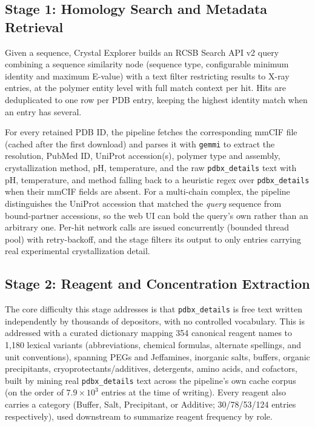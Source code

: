 \subsection{Stage 1: Homology Search and Metadata Retrieval}

Given a sequence, Crystal Explorer builds an RCSB Search API v2 query
combining a sequence similarity node (sequence type, configurable minimum
identity and maximum E-value) with a text filter restricting results to
X-ray entries, at the polymer entity level with full match context per
hit. Hits are deduplicated to one row per PDB entry, keeping the
highest identity match when an entry has several.

For every retained PDB ID, the pipeline fetches the corresponding mmCIF
file (cached after the first download) and parses it with \texttt{gemmi} to
extract the resolution, PubMed ID, UniProt accession(s), polymer type and
assembly, crystallization method, pH, temperature, and the raw
\texttt{pdbx\_details} text with pH, temperature, and method falling
back to a heuristic regex over \texttt{pdbx\_details} when their mmCIF
fields are absent. For a multi-chain complex, the pipeline distinguishes
the UniProt accession that matched the \emph{query} sequence from
bound-partner accessions, so the web UI can bold the query's own rather
than an arbitrary one. Per-hit network calls are issued concurrently
(bounded thread pool) with retry-backoff, and the stage filters its
output to only entries carrying real experimental crystallization
detail.

\subsection{Stage 2: Reagent and Concentration Extraction}

The core difficulty this stage addresses is that
\texttt{pdbx\_details} is free text written independently by thousands of
depositors, with no controlled vocabulary. This is addressed 
with a curated dictionary mapping 354 canonical reagent names to 1{,}180
lexical variants (abbreviations, chemical formulas, alternate spellings,
and unit conventions), spanning PEGs and Jeffamines, inorganic salts,
buffers, organic precipitants, cryoprotectants/additives, detergents,
amino acids, and cofactors, built by mining real \texttt{pdbx\_details}
text across the pipeline's own cache corpus (on the order of
$7.9\times10^3$ entries at the time of writing). Every reagent also
carries a category (Buffer, Salt, Precipitant, or Additive; 30/78/53/124
entries respectively), used downstream to summarize reagent frequency by
role.

